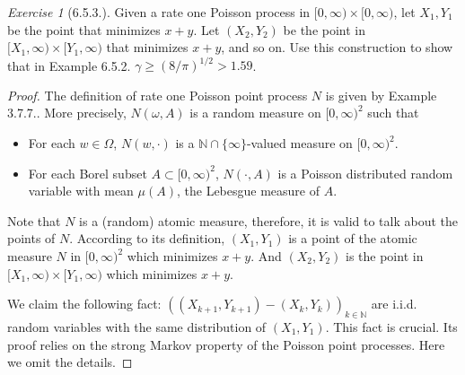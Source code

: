 \documentclass[12pt,a4paper]{amsart}
\theoremstyle{plain}
\theoremstyle{definition}
\theoremstyle{remark}
\newtheorem*{exe}{Exercise}
\numberwithin{equation}{section}
\begin{document}
\begin{exe}[6.5.3.]
Given a rate one Poisson process in $[0,\infty)\times [0,\infty)$, let $X_1,Y_1$ be the point that minimizes $x+y$.
Let $(X_2,Y_2)$ be the point in $[X_1,\infty) \times [Y_1,\infty)$ that minimizes $x+y$, and so on.
Use this construction to show that in Example 6.5.2. $\gamma \geq (8/\pi)^{1/2} > 1.59$. 
\end{exe} 
\begin{proof}
The definition of rate one Poisson point process $N$ is given by Example 3.7.7.. 
More precisely, $N(\omega,A)$ is a random measure on $[0,\infty)^2$ such that
\begin{itemize}
\item
For each $w\in \Omega$, $N(w,\cdot)$ is a $\mathbb N\cap \{\infty\}$-valued measure on $[0,\infty)^2$.
\item
For each Borel subset $A\subset [0,\infty)^2$, $N(\cdot, A)$ is a Poisson distributed random variable with mean $\mu(A)$, the Lebesgue measure of $A$.
\end{itemize}
Note that $N$ is a (random) atomic measure, therefore, it is valid to talk about the points of $N$.
According to its definition, $(X_1,Y_1)$ is a point of the atomic measure $N$ in $[0,\infty)^2$ which minimizes $x+y$. 
And $(X_2,Y_2)$ is the point in $[X_1,\infty) \times [Y_1,\infty)$ which minimizes $x+y$. 

We claim the following fact:
$\left(  (X_{k+1}, Y_{k+1}) - (X_k, Y_k)\right)_{k \in \mathbb N}$ are i.i.d. random variables with the same distribution of $(X_1,Y_1)$.
This fact is crucial. Its proof relies on the strong Markov property of the Poisson point processes. Here we omit the details.


\end{proof}
\end{document}
